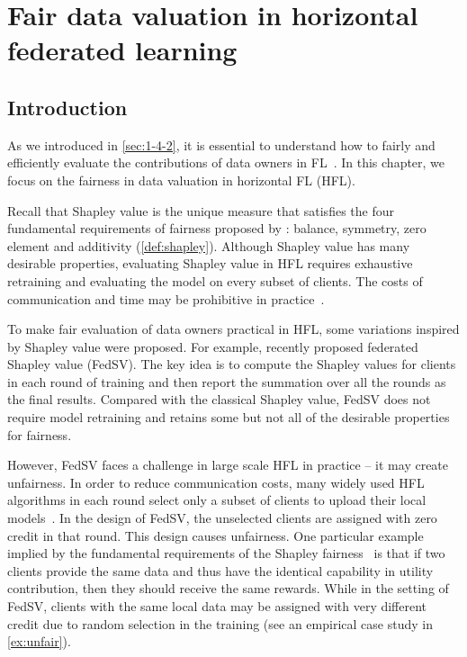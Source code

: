 \chapter{Fair data valuation in horizontal federated learning}
\label{ch:Val-HFL}

\section{Introduction} \label{sec:7-1}

As we introduced in \autoref{sec:1-4-2}, it is essential to understand how to fairly and efficiently evaluate the contributions of data owners in FL~\citep{zhang2020hierarchically,song2019profit,wei2020efficient,wang2020principled}. In this chapter, we focus on the fairness in data valuation in horizontal FL (HFL). 

Recall that Shapley value is the unique measure that satisfies the four fundamental requirements of fairness proposed by \citet{shapley201617}: balance, symmetry, zero element and additivity (\autoref{def:shapley}). Although Shapley value has many desirable properties, evaluating Shapley value in HFL requires exhaustive retraining and evaluating the model on every subset of clients. The costs of communication and time may be prohibitive in practice~\citep{song2019profit}.

To make fair evaluation of data owners practical in HFL, some variations inspired by Shapley value were proposed. For example, \citet{wang2020principled} recently proposed federated Shapley value (FedSV). The key idea is to compute the Shapley values for clients in each round of training and then report the summation over all the rounds as the final results. Compared with the classical Shapley value, FedSV does not require model retraining and retains some but not all of the desirable properties for fairness. 

However, FedSV faces a challenge in large scale HFL in practice -- it may create unfairness.  In order to reduce communication costs, many widely used HFL algorithms in each round select only a subset of clients to upload their local models~\citep{mcmahan2017communication, nishio2019client}. In the design of FedSV, the unselected clients are assigned with zero credit in that round. This design causes unfairness. One particular example implied by the fundamental requirements of the Shapley fairness~\citep{shapley201617} is that if two clients provide the same data and thus have the identical capability in utility contribution, then they should receive the same rewards. While in the setting of FedSV, clients with the same local data may be assigned with very different credit due to random selection in the training (see an empirical case study in \autoref{ex:unfair}). 

